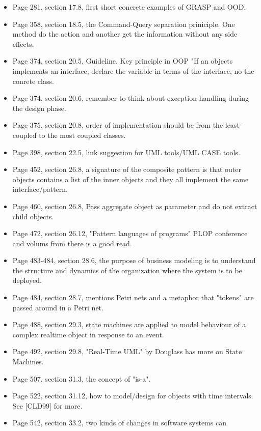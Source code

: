 \begin{itemize}
    \item Page 281, section 17.8, first short concrete examples of GRASP and
        OOD.
    \item Page 358, section 18.5, the Command-Query separation priniciple. One
        method do the action and another get the information without any side
        effects.
    \item Page 374, section 20.5, Guideline. Key principle in OOP "If an
        objects implements an interface, declare the variable in terms of the
        interface, no the conrete class.
    \item Page 374, section 20.6, remember to think about exception handling
        during the design phase.
    \item Page 375, section 20.8, order of implementation should be from the
        least-coupled to the most coupled classes.
    \item Page 398, section 22.5, link suggestion for UML tools/UML CASE tools.
    \item Page 452, section 26.8, a signature of the composite pattern is that
        outer objects contains a list of the inner objects and they all
        implement the same interface/pattern.
    \item Page 460, section 26.8, Pass aggregate object as parameter and do not
        extract child objects.
    \item Page 472, section 26.12, "Pattern languages of programs" PLOP
        conference and volums from there is a good read.
    \item Page 483-484, section 28.6, the purpose of business modeling is to
        understand the structure and dynamics of the organization where the
        system is to be deployed.
    \item Page 484, section 28.7, mentions Petri nets and a metaphor that
        "tokens" are passed around in a Petri net.
    \item Page 488, section 29.3, state machines are applied to model behaviour
        of a complex realtime object in response to an event.
    \item Page 492, section 29.8, "Real-Time UML" by Douglass has more on State
        Machines.
    \item Page 507, section 31.3, the concept of "is-a".
    \item Page 522, section 31.12, how to model/design for objects with time
        intervals. See [CLD99] for more.
    \item Page 542, section 33.2, two kinds of changes in software systems can

\end{itemize}

